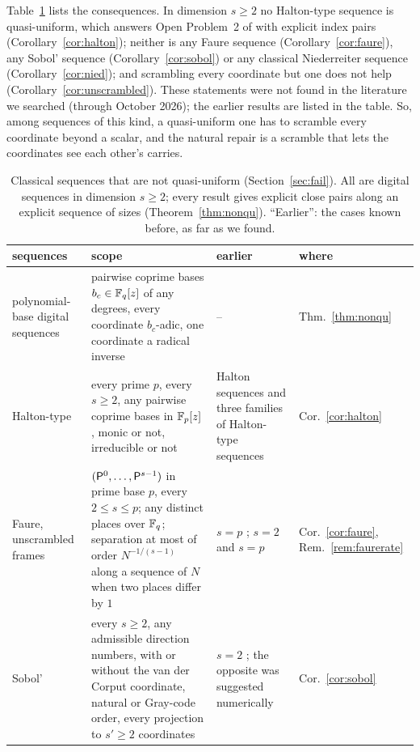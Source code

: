 Table~\ref{tab:negative} lists the consequences. In dimension $s\ge2$ no Halton-type sequence is quasi-uniform, which answers Open Problem~2 of \cite{GHS26} with explicit index pairs (Corollary~\ref{cor:halton}); neither is any Faure sequence (Corollary~\ref{cor:faure}), any Sobol' sequence (Corollary~\ref{cor:sobol}) or any classical Niederreiter sequence (Corollary~\ref{cor:nied}); and scrambling every coordinate but one does not help (Corollary~\ref{cor:unscrambled}). These statements were not found in the literature we searched (through October 2026); the earlier results are listed in the table. So, among sequences of this kind, a quasi-uniform one has to scramble every coordinate beyond a scalar, and the natural repair is a scramble that lets the coordinates see each other's carries.

\begin{table}[t]
\centering
\small
\caption{Classical sequences that are not quasi-uniform (Section~\ref{sec:fail}). All are digital sequences in dimension $s\ge2$; every result gives explicit close pairs along an explicit sequence of sizes (Theorem~\ref{thm:nonqu}). ``Earlier'': the cases known before, as far as we found.}
\label{tab:negative}
\setlength{\tabcolsep}{3pt}
\begin{tabular}{@{}>{\raggedright\arraybackslash}p{}>{\raggedright\arraybackslash}p{}>{\raggedright\arraybackslash}p{}>{\raggedright\arraybackslash}p{}@{}}
\toprule
sequences & scope & earlier & where\\
\midrule
polynomial-base digital sequences & pairwise coprime bases $b_c\in\mathbb{F}_q[z]$ of any degrees, every coordinate $b_c$-adic, one coordinate a radical inverse & -- & Thm.~\ref{thm:nonqu}\\
Halton-type & every prime $p$, every $s\ge2$, any pairwise coprime bases in $\mathbb{F}_p[z]$, monic or not, irreducible or not \cite[Def.~2]{GHS26} & Halton sequences and three families of Halton-type sequences \cite{GHS26} & Cor.~\ref{cor:halton}\\
Faure, unscrambled frames & $(\mathsf{P}^0,\dots,\mathsf{P}^{s-1})$ in prime base $p$, every $2\le s\le p$; any distinct places over $\mathbb{F}_q$; separation at most of order $N^{-1/(s-1)}$ along a sequence of $N$ when two places differ by $1$ & $s=p$ \cite{DGS2}; $s=2$ and $s=p$ \cite{GHS26} & Cor.~\ref{cor:faure}, Rem.~\ref{rem:faurerate}\\
Sobol' & every $s\ge2$, any admissible direction numbers, with or without the van der Corput coordinate, natural or Gray-code order, every projection to $s'\ge2$ coordinates & $s=2$ \cite{Goda23,Suz25}; the opposite was suggested numerically \cite{SS07} & Cor.~\ref{cor:sobol}\\

\end{tabular}
\end{table}
